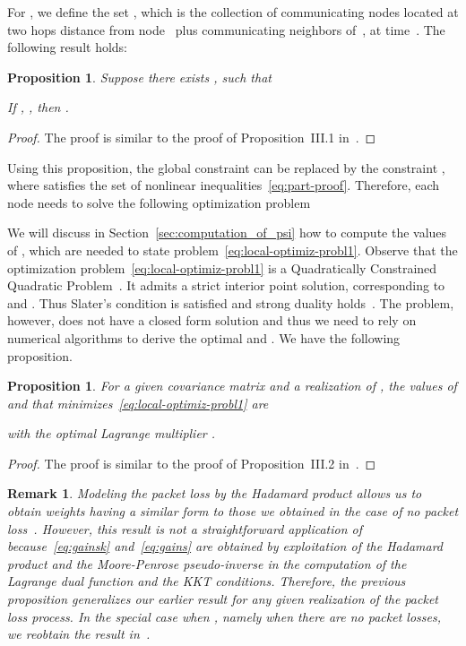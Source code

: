 \documentclass[a4paper,notitlepage,onecolumn]{article}
\newtheorem{proposition}[theorem]{Proposition}
\newtheorem{remark}[theorem]{Remark}
\numberwithin{equation}{section}
\begin{document}
For , we define the set
, which is the collection of
communicating nodes located at two hops distance from
node~ plus communicating neighbors of~, at time~.
The following result holds:
\begin{proposition}
    Suppose there exists , such that
    
    If , , then
    .
    \label{prop:gershorin-like}
\end{proposition}
\begin{proof}
The proof is similar to the proof of Proposition~III.1 in~\cite{JSAC07}.
\end{proof}
Using this proposition, the global constraint  can be replaced by the constraint , where  satisfies the set of nonlinear
inequalities~\eqref{eq:part-proof}. Therefore, each node needs to
solve the following optimization problem

We will discuss in Section~\ref{sec:computation_of_psi} how to
compute the values of , which are needed to state
problem~\eqref{eq:local-optimiz-probl1}. Observe that the
optimization problem~\eqref{eq:local-optimiz-probl1} is a
Quadratically Constrained Quadratic
Problem~\cite[pag.~653]{boyd2}. It admits a strict interior point
solution, corresponding to  and . Thus Slater's condition is satisfied and
strong duality holds~\cite[pag.~226]{boyd2}. The problem, however,
does not have a closed form solution and thus we need to rely on
numerical algorithms to derive the optimal  and
. We have the following proposition.
\begin{proposition}
    \label{prop:optimal-values}
    For a given covariance matrix  and a realization  of , the values of  and  that
    minimizes~\eqref{eq:local-optimiz-probl1} are
    
    with the optimal Lagrange multiplier .
\end{proposition}
\begin{proof}
The proof is similar to the proof of Proposition~III.2
in~\cite{JSAC07}.
\end{proof}
\begin{remark}
Modeling the packet loss by the Hadamard product allows us to
obtain weights having a similar form to those we obtained in the
case of no packet loss~\cite{JSAC07}. However, this result is not
a straightforward application of~\cite{JSAC07}
because~\eqref{eq:gainsk} and~\eqref{eq:gains} are obtained by
exploitation of the Hadamard product and the Moore-Penrose
pseudo-inverse in the computation of the Lagrange dual function
and the KKT conditions. Therefore, the previous proposition
generalizes our earlier result for any given realization of the
packet loss process. In the special case when , namely when there are no packet losses, we reobtain the
result in~\cite{JSAC07}.
\end{remark}
\end{document}
